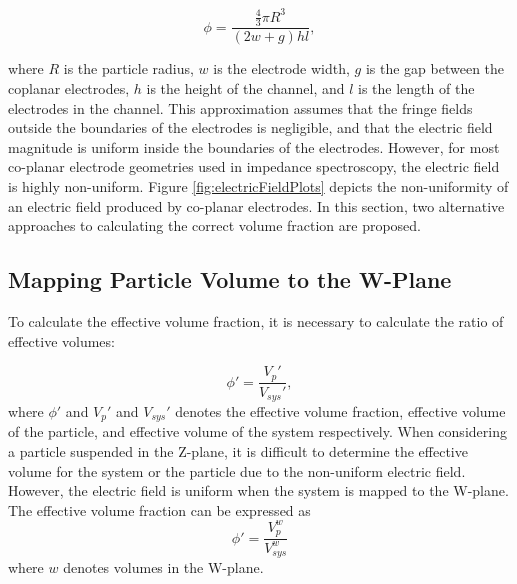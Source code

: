 \begin{equation}
    \phi = \frac{\frac{4}{3}\pi R^3}{(2w+g)hl},
\end{equation}

\noindent where $R$ is the particle radius, $w$ is the electrode width, $g$ is the gap between the coplanar electrodes, $h$ is the height of the channel, and $l$ is the length of the electrodes in the channel. This approximation assumes that the fringe fields outside the boundaries of the electrodes is negligible, and that the electric field magnitude is uniform inside the boundaries of the electrodes. However, for most co-planar electrode geometries used in impedance spectroscopy, the electric field is highly non-uniform. Figure \ref{fig:electricFieldPlots} depicts the non-uniformity of an electric field produced by co-planar electrodes. In this section, two alternative approaches to calculating the correct volume fraction are proposed. 

\subsection*{Mapping Particle Volume to the W-Plane}
\par To calculate the effective volume fraction, it is necessary to calculate the ratio of effective volumes:

\begin{equation}
    \phi ' = \frac{V_p'}{V_{sys}'},
\end{equation}
\noindent where $\phi '$ and $V_p '$ and $V_{sys}'$ denotes the effective volume fraction, effective volume of the particle, and effective volume of the system respectively. When considering a particle suspended in the Z-plane, it is difficult to determine the effective volume for the system or the particle due to the non-uniform electric field. However, the electric field is uniform when the system is mapped to the W-plane. The effective volume fraction can be expressed as
\begin{equation}
    \phi ' = \frac{V^w_p}{V^w_{sys}}
\end{equation}
\noindent where $w$ denotes volumes in the W-plane.

